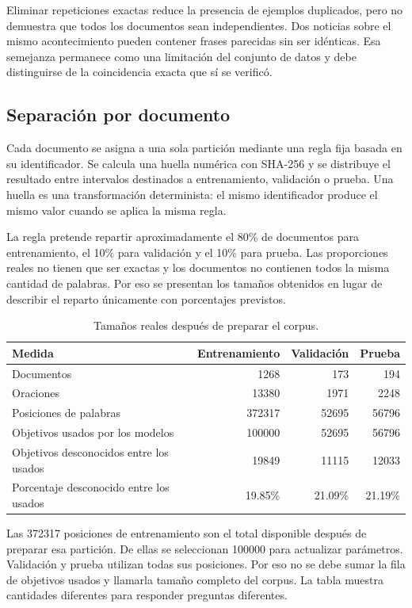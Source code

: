 Eliminar repeticiones exactas reduce la presencia de ejemplos duplicados, pero no demuestra que todos los documentos sean independientes. Dos noticias sobre el mismo acontecimiento pueden contener frases parecidas sin ser idénticas. Esa semejanza permanece como una limitación del conjunto de datos y debe distinguirse de la coincidencia exacta que sí se verificó.

\subsection{Separación por documento}
Cada documento se asigna a una sola partición mediante una regla fija basada en su identificador. Se calcula una huella numérica con SHA-256 y se distribuye el resultado entre intervalos destinados a entrenamiento, validación o prueba. Una huella es una transformación determinista: el mismo identificador produce el mismo valor cuando se aplica la misma regla.

La regla pretende repartir aproximadamente el 80\% de documentos para entrenamiento, el 10\% para validación y el 10\% para prueba. Las proporciones reales no tienen que ser exactas y los documentos no contienen todos la misma cantidad de palabras. Por eso se presentan los tamaños obtenidos en lugar de describir el reparto únicamente con porcentajes previstos.

\begin{table}[tb]
\caption{Tamaños reales después de preparar el corpus.}
\label{tab:corpus_nuevo}
\centering
\begin{tabular}{lrrr}
\toprule Medida & Entrenamiento & Validación & Prueba\\\midrule
Documentos & 1268 & 173 & 194\\
Oraciones & 13380 & 1971 & 2248\\
Posiciones de palabras & 372317 & 52695 & 56796\\
Objetivos usados por los modelos & 100000 & 52695 & 56796\\
Objetivos desconocidos entre los usados & 19849 & 11115 & 12033\\
Porcentaje desconocido entre los usados & 19.85\% & 21.09\% & 21.19\%\\\bottomrule
\end{tabular}
\end{table}

Las 372317 posiciones de entrenamiento son el total disponible después de preparar esa partición. De ellas se seleccionan 100000 para actualizar parámetros. Validación y prueba utilizan todas sus posiciones. Por eso no se debe sumar la fila de objetivos usados y llamarla tamaño completo del corpus. La tabla muestra cantidades diferentes para responder preguntas diferentes.

